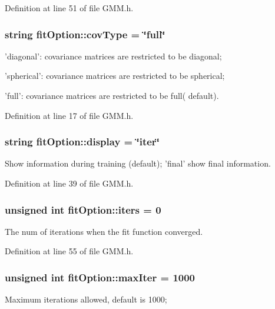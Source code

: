 Definition at line 51 of file G\+M\+M.\+h.

\hypertarget{structfit_option_ae1d880f6fcd26e15f07d50c77c5cceea}{
\subsubsection[{cov\+Type}]{\setlength{\rightskip}{0pt plus 5cm}string fit\+Option\+::cov\+Type = \char`\"{}full\char`\"{}}}\label{structfit_option_ae1d880f6fcd26e15f07d50c77c5cceea}
'diagonal'\+: covariance matrices are restricted to be diagonal;

'spherical'\+: covariance matrices are restricted to be spherical;

'full'\+: covariance matrices are restricted to be full( default). 

Definition at line 17 of file G\+M\+M.\+h.

\hypertarget{structfit_option_acd949efbbb51ddf447d4cb86fd2ac901}{
\subsubsection[{display}]{\setlength{\rightskip}{0pt plus 5cm}string fit\+Option\+::display = \char`\"{}iter\char`\"{}}}\label{structfit_option_acd949efbbb51ddf447d4cb86fd2ac901}
Show information during training (default); 'final' show final information. 

Definition at line 39 of file G\+M\+M.\+h.

\hypertarget{structfit_option_a711048d488fccee5740b31e4149c46de}{
\subsubsection[{iters}]{\setlength{\rightskip}{0pt plus 5cm}unsigned int fit\+Option\+::iters = 0}}\label{structfit_option_a711048d488fccee5740b31e4149c46de}
The num of iterations when the fit function converged. 

Definition at line 55 of file G\+M\+M.\+h.

\hypertarget{structfit_option_a54d1906ece53c348047c8b404ff06053}{
\subsubsection[{max\+Iter}]{\setlength{\rightskip}{0pt plus 5cm}unsigned int fit\+Option\+::max\+Iter = 1000}}\label{structfit_option_a54d1906ece53c348047c8b404ff06053}
Maximum iterations allowed, default is 1000; 


